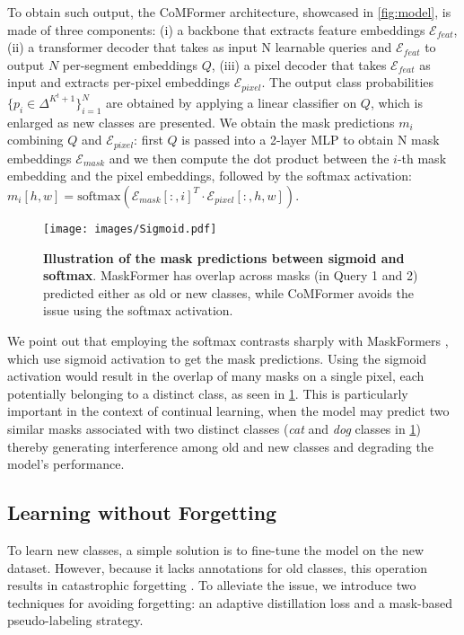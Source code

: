 \documentclass[10pt,twocolumn,letterpaper]{article}
\begin{document}
To obtain such output, the CoMFormer architecture, showcased in \autoref{fig:model}, is made of three components: (i) a backbone that extracts feature embeddings $\mathcal{E}_{feat}$, (ii) a transformer decoder that takes as input N learnable queries and $\mathcal{E}_{feat}$ to output $N$ per-segment embeddings $Q$, (iii) a pixel decoder that takes $\mathcal{E}_{feat}$ as input and extracts per-pixel embeddings $\mathcal{E}_{pixel}$. The output class probabilities $\{p_i \in \Delta^{K^t+1}\}_{i=1}^N$ are obtained by applying a linear classifier on $Q$, which is enlarged as new classes are presented. We obtain the mask predictions $m_i$ combining $Q$ and $\mathcal{E}_{pixel}$: first $Q$ is passed into a 2-layer MLP to obtain N mask embeddings $\mathcal{E}_{mask}$ and we then compute the dot product between the $i$-th mask embedding and the pixel embeddings, followed by the softmax activation: $m_i[h,w] = \text{softmax}(\mathcal{E}_{mask}[:,i]^T \cdot \mathcal{E}_{pixel}[:,h,w])$.

\begin{figure}[t]
    \texttt{[image: images/Sigmoid.pdf]}
    \caption{\textbf{Illustration of the mask predictions between sigmoid and softmax}. MaskFormer has overlap across masks (\eg in Query 1 and 2) predicted either as old or new classes, while CoMFormer avoids the issue using the softmax activation.}
    \label{fig:softmask} \vspace{-1em}
\end{figure}

We point out that employing the softmax contrasts sharply with MaskFormers \cite{cheng2021maskformer, cheng2021masked}, which use sigmoid activation to get the mask predictions. Using the sigmoid activation would result in the overlap of many masks on a single pixel, each potentially belonging to a distinct class, as seen in \cref{fig:softmask}. This is particularly important in the context of continual learning, when the model may predict two similar masks associated with two distinct classes (\eg \textit{cat} and \textit{dog} classes in \cref{fig:softmask}) thereby generating interference among old and new classes and degrading the model's performance.


\subsection{Learning without Forgetting} \label{sec:lwf}
To learn new classes, a simple solution is to fine-tune the model on the new dataset. However, because it lacks annotations for old classes, this operation results in catastrophic forgetting \cite{french1999catastrophicforgetting}. To alleviate the issue, we introduce two techniques for avoiding forgetting: an adaptive distillation loss and a mask-based pseudo-labeling strategy.
\end{document}
